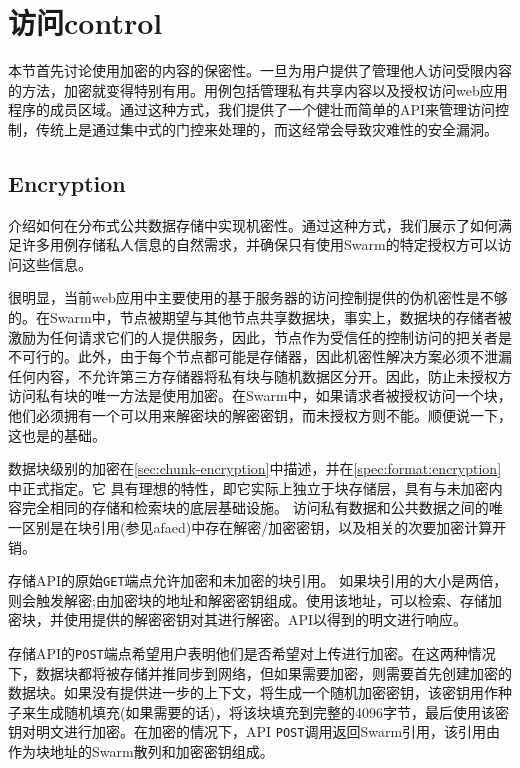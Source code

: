 \section{访问control\statusgreen}\label{sec:access-control}

\green{}

本节首先讨论使用加密的内容的保密性。一旦为用户提供了管理他人访问受限内容的方法，加密就变得特别有用。用例包括管理私有共享内容以及授权访问web应用程序的成员区域。通过这种方式，我们提供了一个健壮而简单的API来管理访问控制，传统上是通过集中式的门控来处理的，而这经常会导致灾难性的安全漏洞。

\subsection{Encryption\statusgreen}\label{sec:encryption}

介绍如何在分布式公共数据存储中实现机密性。通过这种方式，我们展示了如何满足许多用例存储私人信息的自然需求，并确保只有使用Swarm的特定授权方可以访问这些信息。

很明显，当前web应用中主要使用的基于服务器的访问控制提供的伪机密性是不够的。在Swarm中，节点被期望与其他节点共享数据块，事实上，数据块的存储者被激励为任何请求它们的人提供服务，因此，节点作为受信任的控制访问的把关者是不可行的。此外，由于每个节点都可能是存储器，因此机密性解决方案必须不泄漏任何内容，不允许第三方存储器将私有块与随机数据区分开。因此，防止未授权方访问私有块的唯一方法是使用加密。在Swarm中，如果请求者被授权访问一个块，他们必须拥有一个可以用来解密块的解密密钥，而未授权方则不能。顺便说一下，这也是的基础。

数据块级别的加密在\ref{sec:chunk-encryption}中描述，并在\ref{spec:format:encryption}中正式指定。它
具有理想的特性，即它实际上独立于块存储层，具有与未加密内容完全相同的存储和检索块的底层基础设施。
访问私有数据和公共数据之间的唯一区别是在块引用(参见afaed)中存在解密/加密密钥，以及相关的次要加密计算开销。


存储API的原始\lstinline{GET}端点允许加密和未加密的块引用。
如果块引用的大小是两倍，则会触发解密;由加密块的地址和解密密钥组成。使用该地址，可以检索、存储加密块，并使用提供的解密密钥对其进行解密。API以得到的明文进行响应。

存储API的\lstinline{POST}端点希望用户表明他们是否希望对上传进行加密。在这两种情况下，数据块都将被存储并推同步到网络，但如果需要加密，则需要首先创建加密的数据块。如果没有提供进一步的上下文，将生成一个随机加密密钥，该密钥用作种子来生成随机填充(如果需要的话)，将该块填充到完整的4096字节，最后使用该密钥对明文进行加密。在加密的情况下，API \lstinline{POST}调用返回Swarm引用，该引用由作为块地址的Swarm散列和加密密钥组成。

